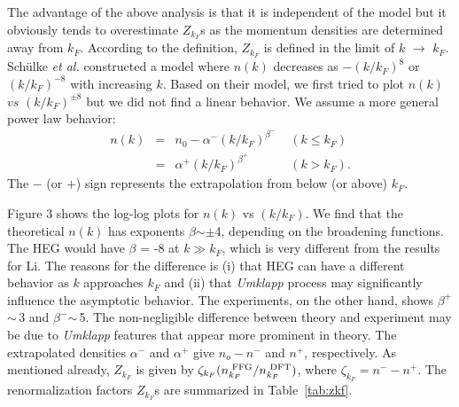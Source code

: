 \documentclass[twocolumn,showpacs,showkeys,fleqn,prl,superscriptaddress]{revtex4}%
\newcommand{\nn}[1]{\textnormal{ #1}}
\newcommand{\ii}[1]{\textit{#1}}
\begin{document}
The advantage of the above analysis is that it is independent of the model but it obviously tends to overestimate $Z_{k_F}$s as the momentum densities are determined away from $k_F$.
According to the definition, $Z_{k_F}$ is defined in the limit of $k$ $\to$ $k_F$. 
Sch{\"u}lke \ii{et al.}\,\,constructed a model where $n(k)$ decreases as $-(k/k_F)^{8}$ or $(k/k_F)^{-8}$ with increasing $k$\cite{schulke96}.
Based on their model, we first tried to plot $n(k)$ $vs$ $(k/k_F)^{\pm 8}$ but we did not find a linear behavior.
We assume a more general  power law behavior:
\begin{eqnarray}
n(k) &=& n_0 - \alpha^{-}  (k/k_F)^{\beta^-}  \;\;\;\; (k \leq k_F)  \nonumber \\
&=&  \alpha^{+}  (k/k_F)^{\beta^+}  \;\;\;\;\;\;\;\;\;\;\;\; (k>k_F).
\end{eqnarray}
The $-$ (or $+$) sign represents the extrapolation from  below (or above) $k_F$.


Figure 3 shows the log-log plots for $n(k)$ vs $(k/k_F)$. %
We find that the theoretical $n(k)$ has  exponents $\beta$$\sim\pm$4, depending on the broadening functions.
The HEG  would have $\beta$ = -8 at $k \gg k_F$, which is very different from the results for Li.
The reasons for the difference is (i) that HEG can have a different behavior as $k$ approaches $k_F$ and (ii) that {\it Umklapp} process may significantly influence the asymptotic behavior.
The experiments, on the other hand, shows $\beta^+$$\sim\,$3 and $\beta^-$$\sim\,$5. 
The non-negligible difference between theory and experiment may be due to {\it Umklapp} features that appear more prominent in theory.
The extrapolated densities $\alpha^-$ and $\alpha^+$ give $n_o - n^-$ and $n^+$, respectively.
As mentioned already,  $Z_{k_F}$ is given by $\zeta_{k_F} (n_{k_F}^{\nn{FFG}}/n_{k_F}^{\nn{DFT}})$, where $\zeta_{k_F}= n^- - n^+$.   
The renormalization factors $Z_{k_F}$s are summarized in %
Table~\ref{tab:zkf}.
\end{document}
